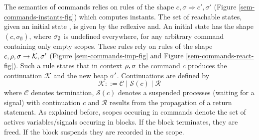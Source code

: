 The semantics of commands relies on rules of the shape $c,\sigma \Rightarrow c',\sigma'$ (Figure \ref{sem-commands-instants-fig})
which computes instants. The set of reachable states, given an initial state , 
is given by the reflexive and. 
An initial state has the shape $(c,\sigma_\emptyset)$, where $\sigma_\emptyset$ is undefined everywhere, for any 
arbitrary command containing only empty scopes.
These rules rely on rules of the shape $c,\rho,\sigma \rightarrow \mathcal{K},\sigma'$ (Figure \ref{sem-commands-imp-fig} and 
Figure \ref{sem-commands-react-fig}). Such a rule states that in context $\rho,\sigma$ the command $c$ produces the 
continuation $\mathcal{K}$ and the new heap $\sigma'$.
Continuations are defined by 
$$
\mathcal{K} ::= \mathcal{C} \mid \mathcal{S}(c) \mid \mathcal{R} 
$$
where $\mathcal{C}$ denotes termination, $\mathcal{S}(c)$ denotes a suspended processes (waiting for a signal) with continuation $c$ 
and $\mathcal{R}$ results from the propagation of a return statement.
As explained before, scopes occuring in commands denote the set of actives variables/signals occuring in blocks.
If the block terminates, they are freed. If the block suspends they are recorded in the scope.
